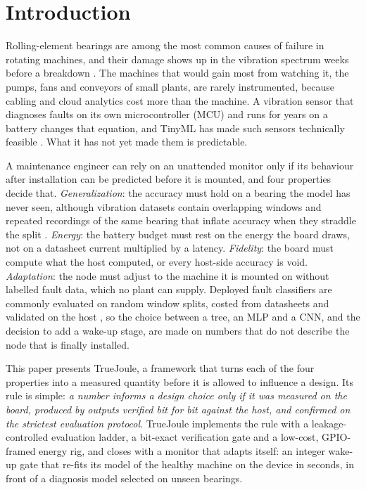 \documentclass[conference]{IEEEtran}
\newcommand{\TJ}{TrueJoule}
\begin{document}
\section{Introduction}
Rolling-element bearings are among the most common causes of failure in rotating machines, and their damage shows up
in the vibration spectrum weeks before a breakdown \cite{randall2011rolling}. The machines that would gain most from
watching it, the pumps, fans and conveyors of small plants, are rarely instrumented, because cabling and cloud
analytics cost more than the machine. A vibration sensor that diagnoses faults on its own microcontroller (MCU) and
runs for years on a battery changes that equation, and TinyML has made such sensors technically feasible
\cite{chen2023lopdm,lu2023edge,alharthi2026tinyml}. What it has not yet made them is predictable.

A maintenance engineer can rely on an unattended monitor only if its behaviour after installation can be predicted
before it is mounted, and four properties decide that. \emph{Generalization}: the accuracy must hold on a bearing the
model has never seen, although vibration datasets contain overlapping windows and repeated recordings of the same
bearing that inflate accuracy when they straddle the split \cite{hendriks2022towards,vieira2026towards,
varejao2025similarity}. \emph{Energy}: the battery budget must rest on the energy the board draws, not on a datasheet
current multiplied by a latency. \emph{Fidelity}: the board must compute what the host computed, or every host-side
accuracy is void. \emph{Adaptation}: the node must adjust to the machine it is mounted on without labelled fault data,
which no plant can supply. Deployed fault classifiers are commonly evaluated on random window splits, costed from
datasheets and validated on the host \cite{banerjee2026ondevice,shoba2026whispernet,lima2025edgeimpulse,
sairam2026tinycommfl}, so the choice between a tree, an MLP and a CNN, and the decision to add a wake-up stage, are
made on numbers that do not describe the node that is finally installed.

This paper presents \TJ{}, a framework that turns each of the four properties into a measured quantity before it is
allowed to influence a design. Its rule is simple: \emph{a number informs a design choice only if it was measured on
the board, produced by outputs verified bit for bit against the host, and confirmed on the strictest evaluation
protocol}. \TJ{} implements the rule with a leakage-controlled evaluation ladder, a bit-exact verification gate and a
low-cost, GPIO-framed energy rig, and closes with a monitor that adapts itself: an integer wake-up gate that re-fits its
model of the healthy machine on the device in seconds, in front of a diagnosis model selected on unseen bearings.
\end{document}
